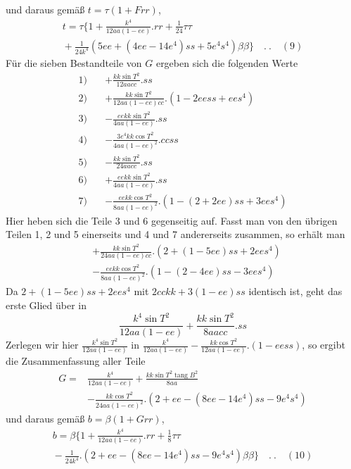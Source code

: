 %
und daraus gemäß \(t=\tau(1+Frr)\),
\[
\begin{aligned}
t=\tau\{1+\frac{k^4}{12aa(1-ee)}\mathord{.}rr+\tfrac1{24}\tau\tau\\
{}+\frac1{24k^4}(5ee+(4ee-14e^4)ss+5e^4s^4)\beta\beta\}\quad .\ .\quad(9)
\end{aligned}
\]
Für die sieben Bestandteile von \(G\) ergeben sich die folgenden Werte
\[
\begin{aligned}
1)\quad&+\frac{kk\sin T^2}{12aacc}\mathord{.}ss\\
2)\quad&+\frac{kk\sin T^2}{12aa(1-ee)cc}\mathord{.}(1-2eess+ees^4)\\
3)\quad&-\frac{eekk\sin T^2}{4aa(1-ee)}\mathord{.}ss\\
4)\quad&-\frac{3e^4kk\cos T^2}{4aa(1-ee)^2}\mathord{.}ccss\\
5)\quad&-\frac{kk\sin T^2}{24aacc}\mathord{.}ss\\
6)\quad&+\frac{eekk\sin T^2}{4aa(1-ee)}\mathord{.}ss\\
7)\quad&-\frac{eekk\cos T^2}{8aa(1-ee)^2}\mathord{.}(1-(2+2ee)ss+3ees^4)
\end{aligned}
\]
Hier heben sich die Teile 3 und 6 gegenseitig auf. Fasst man von den übrigen Teilen 1, 2 und 5 einerseits und 4 und 7 andererseits zusammen, so erhält man
\[
\begin{aligned}
&+\frac{kk\sin T^2}{24aa(1-ee)cc}\mathord{.}(2+(1-5ee)ss+2ees^4)\\
&-\frac{eekk\cos T^2}{8aa(1-ee)^2}\mathord{.}(1-(2-4ee)ss-3ees^4)
\end{aligned}
\]
Da \(2+(1-5ee)ss+2ees^4\) mit \(2cckk+3(1-ee)ss\) identisch ist, geht das erste Glied über in
\[
\frac{k^4\sin T^2}{12aa(1-ee)}+\frac{kk\sin T^2}{8aacc}\mathord{.}ss
\]
Zerlegen wir hier \(\frac{k^4\sin T^2}{12aa(1-ee)}\) in \(\frac{k^4}{12aa(1-ee)}-\frac{kk\cos T^2}{12aa(1-ee)}\mathord{.}(1-eess)\), so ergibt die Zusammenfassung aller Teile
\[
\begin{aligned}
G={}&\frac{k^4}{12aa(1-ee)}+\frac{kk\sin T^2\operatorname{tang}B^2}{8aa}\\
&-\frac{kk\cos T^2}{24aa(1-ee)^2}\mathord{.}(2+ee-(8ee-14e^4)ss-9e^4s^4)
\end{aligned}
\]
und daraus gemäß \(b=\beta(1+Grr)\),
\[
\begin{aligned}
b=\beta\{1+\frac{k^4}{12aa(1-ee)}\mathord{.}rr+\tfrac18\tau\tau\\
{}-\frac1{24k^4}\mathord{.}(2+ee-(8ee-14e^4)ss-9e^4s^4)\beta\beta\}\quad .\ .\quad(10)
\end{aligned}
\]
